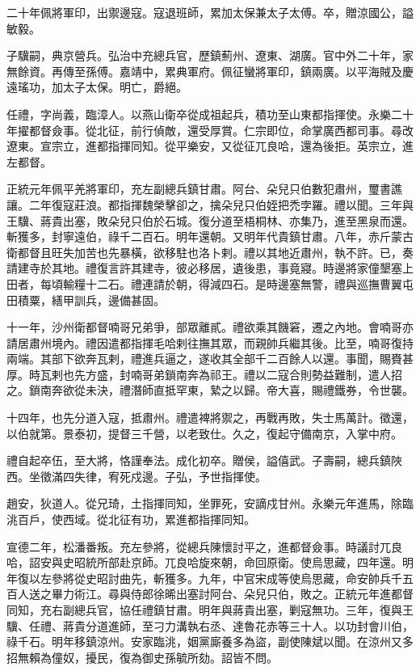 \begin{pinyinscope}
二十年佩將軍印，出禦邊寇。寇退班師，累加太保兼太子太傅。卒，贈涼國公，謚敏毅。

子驥嗣，典京營兵。弘治中充總兵官，歷鎮薊州、遼東、湖廣。官中外二十年，家無餘資。再傳至孫傅。嘉靖中，累典軍府。佩征蠻將軍印，鎮兩廣。以平海賊及慶遠瑤功，加太子太保。明亡，爵絕。

任禮，字尚義，臨漳人。以燕山衛卒從成祖起兵，積功至山東都指揮使。永樂二十年擢都督僉事。從北征，前行偵敵，還受厚賞。仁宗即位，命掌廣西都司事。尋改遼東。宣宗立，進都指揮同知。從平樂安，又從征兀良哈，還為後拒。英宗立，進左都督。

正統元年佩平羌將軍印，充左副總兵鎮甘肅。阿台、朵兒只伯數犯肅州，璽書譙讓。二年復寇莊浪。都指揮魏榮擊卻之，擒朵兒只伯姪把禿孛羅。禮以聞。三年與王驥、蔣貴出塞，敗朵兒只伯於石城。復分道至梧桐林、亦集乃，進至黑泉而還。斬獲多，封寧遠伯，祿千二百石。明年還朝。又明年代貴鎮甘肅。八年，赤斤蒙古衛都督且旺失加苦也先暴橫，欲移駐也洛卜剌。禮以其地近肅州，執不許。已，奏請建寺於其地。禮復言許其建寺，彼必移居，遺後患，事竟寢。時邊將家僮墾塞上田者，每頃輸糧十二石。禮連請於朝，得減四石。是時邊塞無警，禮與巡撫曹翼屯田積粟，繕甲訓兵，邊備甚固。

十一年，沙州衛都督喃哥兄弟爭，部眾離貳。禮欲乘其饑窘，遷之內地。會喃哥亦請居肅州境內。禮因遣都指揮毛哈剌往撫其眾，而親帥兵繼其後。比至，喃哥復持兩端。其部下欲奔瓦剌，禮進兵逼之，遂收其全部千二百餘人以還。事聞，賜賚甚厚。時瓦剌也先方盛，封喃哥弟鎖南奔為祁王。禮以二寇合則勢益難制，遣人招之。鎖南奔欲從未決，禮潛師直抵罕東，縶之以歸。帝大喜，賜禮鐵券，令世襲。

十四年，也先分道入寇，抵肅州。禮遣裨將禦之，再戰再敗，失士馬萬計。徵還，以伯就第。景泰初，提督三千營，以老致仕。久之，復起守備南京，入掌中府。

禮自起卒伍，至大將，恪謹奉法。成化初卒。贈侯，謚僖武。子壽嗣，總兵鎮陜西。坐徵滿四失律，宥死戍邊。子弘，予世指揮使。

趙安，狄道人。從兄琦，土指揮同知，坐罪死，安謫戍甘州。永樂元年進馬，除臨洮百戶，使西域。從北征有功，累進都指揮同知。

宣德二年，松潘番叛。充左參將，從總兵陳懷討平之，進都督僉事。時議討兀良哈，詔安與史昭統所部赴京師。兀良哈旋來朝，命回原衛。使烏思藏，四年還。明年復以左參將從史昭討曲先，斬獲多。九年，中官宋成等使烏思藏，命安帥兵千五百人送之畢力術江。尋與侍郎徐晞出塞討阿台、朵兒只伯，敗之。正統元年進都督同知，充右副總兵官，協任禮鎮甘肅。明年與蔣貴出塞，剿寇無功。三年，復與王驥、任禮、蔣貴分道進師，至刁力溝執右丞、達魯花赤等三十人。以功封會川伯，祿千石。明年移鎮涼州。安家臨洮，姻黨廝養多為盜，副使陳斌以聞。在涼州又多招無賴為僮奴，擾民，復為御史孫毓所劾。詔皆不問。


\end{pinyinscope}
